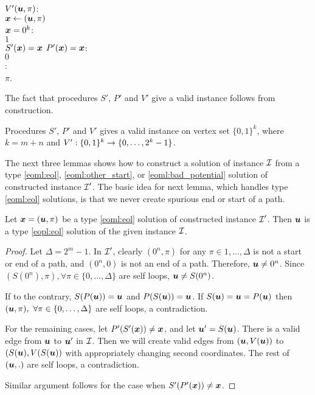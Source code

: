 \begin{algo}
  \underline{$V'(\mbox{\boldmath $u$},\pi)$}:\+
  \\$\mbox{\boldmath $x$} \gets (\mbox{\boldmath $u$},\pi)$
  \\\IfB $\mbox{\boldmath $x$}=0^k$:\+
  \\  \ReturnB $1$\-
  \\\ElseIfB $S'(\mbox{\boldmath $x$}) = \mbox{\boldmath $x$}$ \AndB $P'(\mbox{\boldmath $x$})=\mbox{\boldmath $x$}$:\+
  \\  \ReturnB $0$\-
  \\\ElseB:\quad{}\+
  \\  \ReturnB $\pi$.\-
\end{algo}

The fact that procedures $S'$, $P'$ and $V'$ give a valid \EOML instance follows from construction.
\begin{lemma}\label{lem:p2m-valid}
Procedures $S'$, $P'$ and $V'$ gives a valid \EOML instance on vertex set $\{0,1\}^k$, where $k=m+n$ and $V':\{0,1\}^k\rightarrow \{0,\dots, 2^k-1\}$.
\end{lemma}

The next three lemmas shows how to construct a solution of \EOPL instance $\mbox{${\mathcal I}$}$ from a type \ref{eoml:eol}, \ref{eoml:other_start}, or \ref{eoml:bad_potential} solution of constructed \EOML instance $\mbox{${\mathcal I}$}'$.
The basic idea for next lemma, which handles type \ref{eoml:eol} solutions, is that we never create spurious end or start of a path. 
\begin{lemma}\label{lem:p2m-t1}
Let $\mbox{\boldmath $x$}=(\mbox{\boldmath $u$},\pi)$ be a type \ref{eoml:eol} solution of constructed \EOML instance $\mbox{${\mathcal I}$}'$. Then $\mbox{\boldmath $u$}$ is a type \ref{eopl:eol} solution of the given \EOPL instance $\mbox{${\mathcal I}$}$.
\end{lemma}

\begin{proof}
Let $\Delta=2^m-1$.
In $\mbox{${\mathcal I}$}'$, clearly $(0^n,\pi)$ for any $\pi \in {1,\dots, \Delta}$ is not a start or end of a path, and $(0^n,0)$ is not an end of a path. Therefore, $\mbox{\boldmath $u$}\neq 0^n$. Since $(S(0^n),\pi), \forall \pi\in \{0,\dots,\Delta\}$ are self loops, $\mbox{\boldmath $u$} \neq S(0^n)$.

If to the contrary, $S(P(\mbox{\boldmath $u$}))=\mbox{\boldmath $u$}$ and $P(S(\mbox{\boldmath $u$}))=\mbox{\boldmath $u$}$. If $S(\mbox{\boldmath $u$})=\mbox{\boldmath $u$}=P(\mbox{\boldmath $u$})$ then $(\mbox{\boldmath $u$},\pi),\ \forall \pi\in\{0,\dots,\Delta\}$ are self loops, a contradiction. 

For the remaining cases, let $P'(S'(\mbox{\boldmath $x$}))\neq \mbox{\boldmath $x$}$, and let $\mbox{\boldmath $u$}'=S(\mbox{\boldmath $u$})$. There is a valid edge from $\mbox{\boldmath $u$}$ to $\mbox{\boldmath $u$}'$ in $\mbox{${\mathcal I}$}$. Then we will create valid edges from $(\mbox{\boldmath $u$},V(\mbox{\boldmath $u$}))$ to $(S(\mbox{\boldmath $u$}),V(S(\mbox{\boldmath $u$}))$ with appropriately changing second coordinates. The rest of $(\mbox{\boldmath $u$},.)$ are self loops, a contradiction. 

Similar argument follows for the case when $S'(P'(\mbox{\boldmath $x$}))\neq \mbox{\boldmath $x$}$. 
\end{proof}

